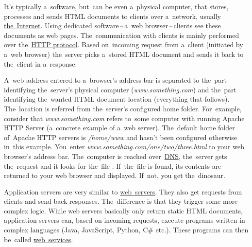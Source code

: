 \label{namespaces}

\label{webserver}
It's typically a~software, but~can be even a~physical computer, that stores, processes and sends HTML documents to clients over a~network, usually \hyperref[internetweb]{the~Internet}. Using dedicated software\,--\,a~web browser\,--\,clients see these documents as web pages. The~communication with clients is mainly performed over the~\hyperref[http]{HTTP protocol}. Based on~incoming request from a~client (initiated by a~web browser) the~server picks a~stored HTML document and sends it back to the~client in a~response.

A~web address entered to a~browser's address bar is separated to the~part identifying the~server's physical computer (\textit{www.something.com}) and the~part identifying the~wanted HTML document location (everything that follows). The~location is referred from the~server's configured home folder. For~example, consider that \textit{www.something.com} refers to~some computer with running Apache HTTP Server (a~concrete example of a~web server). The~default home folder of~Apache HTTP servers is \textit{/home/www} and hasn't been configured otherwise in~this example. You~enter \textit{www.something.com/one/two/three.html} to your web browser's address bar. The~computer is reached over~\hyperref[dns]{DNS}, the~server gets the~request and it looks for the~file . If~the~file is found, its contents are returned to your web browser and displayed. If~not, you get the~dinosaur.

\label{applicationserver}
Application servers are very similar to \hyperref[webserver]{web~servers}. They also get requests from clients and send back responses. The~difference is that they trigger some more complex logic. While web servers basically only return static HTML documents, application servers can, based on incoming requests, execute programs written in complex languages (Java, JavaScript, Python, C\# etc.). These programs can then be~called \hyperref[webservice]{web~services}.

\label{dns}
